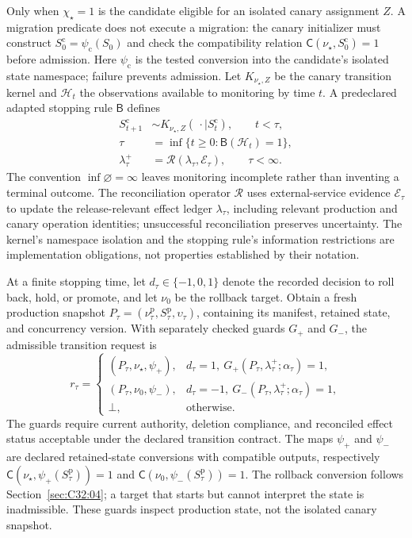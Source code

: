 Only when $\chi_\star=1$ is the candidate eligible for an isolated canary assignment $Z$. A migration predicate does not execute a migration: the canary initializer must construct $S_0^{\mathrm c}=\psi_{\mathrm c}(S_0)$ and check the compatibility relation $\mathsf C(\nu_\star,S_0^{\mathrm c})=1$ before admission. Here $\psi_{\mathrm c}$ is the tested conversion into the candidate's isolated state namespace; failure prevents admission. Let $K_{\nu_\star,Z}$ be the canary transition kernel and $\mathcal H_t$ the observations available to monitoring by time $t$. A predeclared adapted stopping rule $\mathsf B$ defines
\begin{equation}
\label{eq:C32:canary-stopping}
\begin{aligned}
 S_{t+1}^{\mathrm c}&\sim K_{\nu_\star,Z}(\,\cdot\mid S_t^{\mathrm c}),\qquad t<\tau,\\
 \tau&=\inf\{t\geq0:\mathsf B(\mathcal H_t)=1\},\\
 \lambda_\tau^{+}
 &=\mathcal R(\lambda_\tau,\mathcal E_\tau),\qquad \tau<\infty.
\end{aligned}
\end{equation}
The convention $\inf\varnothing=\infty$ leaves monitoring incomplete rather than inventing a terminal outcome. The reconciliation operator $\mathcal R$ uses external-service evidence $\mathcal E_\tau$ to update the release-relevant effect ledger $\lambda_\tau$, including relevant production and canary operation identities; unsuccessful reconciliation preserves uncertainty. The kernel's namespace isolation and the stopping rule's information restrictions are implementation obligations, not properties established by their notation.

At a finite stopping time, let $d_\tau\in\{-1,0,1\}$ denote the recorded decision to roll back, hold, or promote, and let $\nu_0$ be the rollback target. Obtain a fresh production snapshot $P_\tau=(\nu_\tau^{\mathrm p},S_\tau^{\mathrm p},\upsilon_\tau)$, containing its manifest, retained state, and concurrency version. With separately checked guards $G_+$ and $G_-$, the admissible transition request is
\begin{equation}
\label{eq:C32:release-transition}
 r_\tau=
 \begin{cases}
 (P_\tau,\nu_\star,\psi_+),&d_\tau=1,\ G_+(P_\tau,\lambda_\tau^{+};\alpha_\tau)=1,\\
 (P_\tau,\nu_0,\psi_-),&d_\tau=-1,\ G_-(P_\tau,\lambda_\tau^{+};\alpha_\tau)=1,\\
 \bot,&\text{otherwise}.
 \end{cases}
\end{equation}
The guards require current authority, deletion compliance, and reconciled effect status acceptable under the declared transition contract. The maps $\psi_+$ and $\psi_-$ are declared retained-state conversions with compatible outputs, respectively $\mathsf C(\nu_\star,\psi_+(S_\tau^{\mathrm p}))=1$ and $\mathsf C(\nu_0,\psi_-(S_\tau^{\mathrm p}))=1$. The rollback conversion follows Section~\ref{sec:C32:04}; a target that starts but cannot interpret the state is inadmissible. These guards inspect production state, not the isolated canary snapshot.

